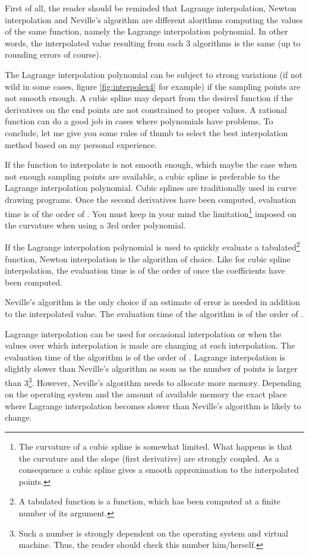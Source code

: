 \documentclass[twoside]{book}
\begin{document}
First of all, the reader should be reminded that Lagrange
interpolation, Newton interpolation and Neville's algorithm are
different alorithms computing the values of the same function,
namely the Lagrange interpolation polynomial. In other words, the
interpolated value resulting from each 3 algorithms is the same
(up to rounding errors of course).

The Lagrange interpolation polynomial can be subject to strong
variations (if not wild in some cases, figure
\ref{fig:interpolex4} for example) if the sampling points are not
smooth enough. A cubic spline may depart from the desired function
if the derivatives on the end points are not constrained to proper
values. A rational function can do a good job in cases where
polynomials have problems. To conclude, let me give you some rules
of thumb to select the best interpolation method based on my
personal experience.

If the function to interpolate is not smooth enough, which maybe
the case when not enough sampling points are available, a cubic
spline is preferable to the Lagrange interpolation polynomial.
Cubic splines are traditionally used in curve drawing programs.
Once the second derivatives have been computed, evaluation time is
of the order of . You must keep in your mind the
limitation\footnote{The curvature of a cubic spline is somewhat
limited. What happens is that the curvature and the slope (first
derivative) are strongly coupled. As a consequence a cubic spline
gives a smooth approximation to the interpolated points.} imposed
on the curvature when using a 3rd order polynomial.

If the Lagrange interpolation polynomial is used to quickly
evaluate a tabulated\footnote{A tabulated function is a function,
which has been computed at a finite number of its argument.}
function, Newton interpolation is the algorithm of choice. Like
for cubic spline interpolation, the evaluation time is of the
order of  once the coefficients have been computed.

Neville's algorithm is the only choice if an estimate of error is
needed in addition to the interpolated value. The evaluation time
of the algorithm is of the order of .

Lagrange interpolation can be used for occasional interpolation or
when the values over which interpolation is made are changing at
each interpolation. The evaluation time of the algorithm is of the
order of . Lagrange interpolation is slightly slower than
Neville's algorithm as soon as the number of points is larger than
3\footnote{\label{ft:lagnev}Such a number is strongly dependent on
the operating system and virtual machine. Thus, the reader should
check this number him/herself.}. However, Neville's algorithm
needs to allocate more memory. Depending on the operating system
and the amount of available memory the exact place where Lagrange
interpolation becomes slower than Neville's algorithm is likely to
change.
\end{document}
